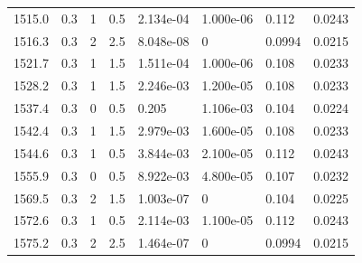 \documentclass[preview]{standalone}
\begin{document}
{{{{{\begin{tabular}{L{1.2cm}C{1.2cm} C{0.3cm}C{0.5cm} C{1.4cm}C{1.4cm} C{1.4cm}C{1.4cm}}
  1515.0  &   0.3  & 1     & 0.5 &  2.134e-04  & 1.000e-06  & 0.112 &  0.0243   \\ 
  1516.3  &   0.3  & 2     & 2.5 &  8.048e-08  & 0  & 0.0994 &  0.0215   \\ 
  1521.7  &   0.3  & 1     & 1.5 &  1.511e-04  & 1.000e-06  & 0.108 &  0.0233   \\ 
  1528.2  &   0.3  & 1     & 1.5 &  2.246e-03  & 1.200e-05  & 0.108 &  0.0233   \\ 
  1537.4  &   0.3  & 0     & 0.5 &  0.205  & 1.106e-03  & 0.104 &  0.0224   \\ 
  1542.4  &   0.3  & 1     & 1.5 &  2.979e-03  & 1.600e-05  & 0.108 &  0.0233   \\ 
  1544.6  &   0.3  & 1     & 0.5 &  3.844e-03  & 2.100e-05  & 0.112 &  0.0243   \\ 
  1555.9  &   0.3  & 0     & 0.5 &  8.922e-03  & 4.800e-05  & 0.107 &  0.0232   \\ 
  1569.5  &   0.3  & 2     & 1.5 &  1.003e-07  & 0  & 0.104 &  0.0225   \\ 
  1572.6  &   0.3  & 1     & 0.5 &  2.114e-03  & 1.100e-05  & 0.112 &  0.0243   \\ 
  1575.2  &   0.3  & 2     & 2.5 &  1.464e-07  & 0  & 0.0994 &  0.0215   \\ 
\hline 
\end{tabular} 

}}}}}
\end{document}
